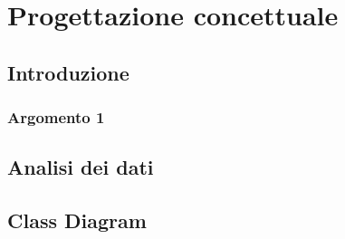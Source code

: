 \chapter{Progettazione concettuale}
\section{Introduzione}
\subsection{Argomento 1}
\section{Analisi dei dati}
\section{Class Diagram}

